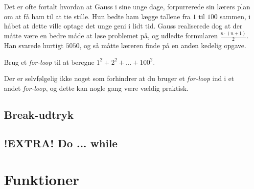 		\begin{exercise}
			Det er ofte fortalt hvordan at Gauss i sine unge dage, forpurrerede sin
			lærers plan om at få ham til at tie stille. Hun bedte ham lægge tallene
			fra \(1\) til \(100\) sammen, i håbet at dette ville optage det unge
			geni i lidt tid. Gauss realiserede dog at der måtte være en bedre måde
			at løse problemet på, og udledte formularen \(\frac{n\cdot(n+1)}{2}\).
			Han svarede hurtigt \(5050\), og så måtte læreren finde på en anden
			kedelig opgave.

			Brug et \emph{for-loop} til at beregne \(1^2+2^2+\dots+100^2\).
		\end{exercise}

		\begin{exercise}
			Der er selvfølgelig ikke noget som forhindrer at du bruger et
			\emph{for-loop} ind i et andet \emph{for-loop}, og dette kan nogle gang
			være vældig praktisk.

		\end{exercise}

	\subsection{Break-udtryk}




	\subsection{!EXTRA! Do ... while}



\section{Funktioner}

